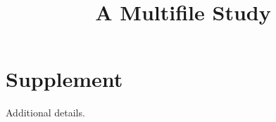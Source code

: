 \documentclass{article}
\title{A Multifile Study}
\begin{document}


\appendix
\section{Supplement}
Additional details.
\end{document}
